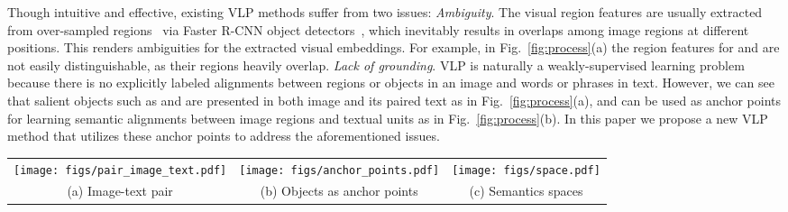 \documentclass[runningheads]{llncs}
\newcommand{\short}{\textsc{Oscar}}
\begin{document}
Though intuitive and effective, 
existing VLP methods suffer from two issues: 
 {\it Ambiguity}. The visual region features are usually extracted from over-sampled regions~\cite{anderson2018bottom} via Faster R-CNN object detectors~\cite{ren2015faster}, which inevitably results in overlaps among image regions at different positions. 
This renders ambiguities for the extracted visual embeddings. For example, in Fig.~\ref{fig:process}(a) the region features for  and  are not easily distinguishable, as their regions heavily overlap.
 {\it Lack of grounding}. VLP is naturally a weakly-supervised learning problem because there is no explicitly labeled alignments between regions or objects in an image and words or phrases in text. However, we can see that salient objects such as  and  are presented in both image and its paired text as in Fig.~\ref{fig:process}(a), and can be used as anchor points for learning semantic alignments between image regions and textual units as in Fig.~\ref{fig:process}(b). In this paper we propose a new VLP method that utilizes these anchor points to address the aforementioned issues.






\begin{figure*}[t!]
\centering
\begin{tabular}{c c c}
	\hspace{-2mm}
	\texttt{[image: figs/pair\_image\_text.pdf]} & 
	 \hspace{-0mm}
	\texttt{[image: figs/anchor\_points.pdf]} &
	\hspace{2mm}  
	\texttt{[image: figs/space.pdf]}
	\\
	(a) Image-text pair \vspace{2mm} & 
	\hspace{-2mm}  
	(b) Objects as anchor points \hspace{-0mm} &
	(c) Semantics spaces
	\\ 
\end{tabular}
\vspace{-2mm}
\caption{Illustration on the process that \short{} represents an image-text pair into semantic space via dictionary look up. (a) An example of input image-text pair (b) The object tags are used as anchor points to align image regions with word embeddings of pre-trained language models. (c) The word semantic space is more representative than image region features. In this example,  and  are similar in the visual feature space due to the overlap regions, but distinctive in the word embedding space.}
\label{fig:process}
\vspace{-2mm}
\end{figure*}
\end{document}

